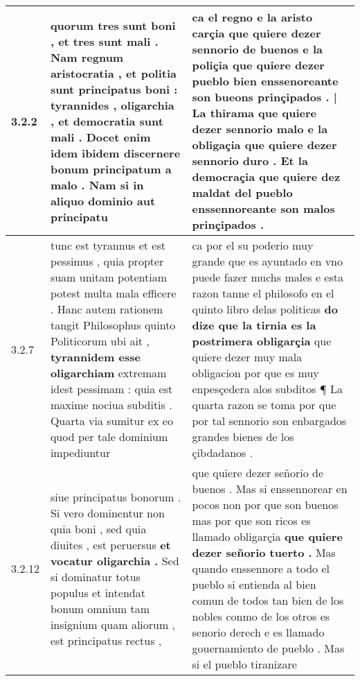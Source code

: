 \begin{tabular}{|p{1cm}|p{6.5cm}|p{6.5cm}|}

\hline
3.2.2 & quorum tres sunt boni , et tres sunt mali . Nam regnum aristocratia , et politia sunt principatus boni : \textbf{ tyrannides , oligarchia , et democratia sunt mali . } Docet enim idem ibidem discernere bonum principatum a malo . Nam si in aliquo dominio aut principatu & ca el regno e la aristo carçia que quiere dezer sennorio de buenos e la poliçia que quiere dezer pueblo bien \textbf{ enssenoreante son bueons prinçipados . | La thirama que quiere dezer sennorio malo } e la obligaçia que quiere dezer sennorio duro . Et la democraçia que quiere dez maldat del pueblo enssennoreante son malos prinçipados . \\\hline
3.2.7 & tunc est tyrannus et est pessimus , quia propter suam unitam potentiam potest multa mala efficere . Hanc autem rationem tangit Philosophus quinto Politicorum ubi ait , \textbf{ tyrannidem esse oligarchiam } extremam idest pessimam : quia est maxime nociua subditis . Quarta via sumitur ex eo quod per tale dominium impediuntur & ca por el su poderio muy grande que es ayuntado en vno puede fazer muchs males e esta razon tanne el philosofo en el quinto libro delas politicas \textbf{ do dize que la tirnia es la postrimera obligarçia } que quiere dezer muy mala obligacion por que es muy enpesçedera alos subditos ¶ La quarta razon se toma por que por tal sennorio son enbargados grandes bienes de los çibdadanos . \\\hline
3.2.12 & siue principatus bonorum . Si vero dominentur non quia boni , sed quia diuites , est peruersus \textbf{ et vocatur oligarchia . } Sed si dominatur totus populus et intendat bonum omnium tam insignium quam aliorum , est principatus rectus , & que quiere dezer señorio de buenos . Mas si enssennorear en pocos non por que son buenos mas por que son ricos es llamado obligarçia \textbf{ que quiere dezer señorio tuerto . } Mas quando enssennore a todo el pueblo si entienda al bien comun de todos tan bien de los nobles conmo de los otros es senorio derech e es llamado gouernamiento de pueblo . Mas si el pueblo tiranizare \\\hline

\end{tabular}
